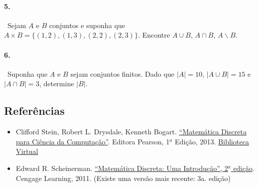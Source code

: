 \paragraph{5.}~Sejam \(A\) e \(B\) conjuntos e suponha que
  \(A\times B=\{(1,2),(1,3),(2,2),(2,3)\}\). Encontre \(A\cup B\),
  \(A\cap B\), \(A\backslash B\).


\paragraph{6.}~Suponha que \(A\) e \(B\) sejam conjuntos finitos. Dado que
  \(|A|=10\), \(|A\cup B|=15\) e \(|A\cap B|=3\), determine \(|B|\).

\subsection*{Referências}

\begin{itemize}
\item
  Clifford Stein, Robert L. Drysdale, Kenneth Bogart.
  \href{https://plataforma.bvirtual.com.br/Acervo/Publicacao/3824}{``Matemática
  Discreta para Ciência da Computação''}. Editora Pearson, 1$^a$ Edição,
  2013.
  \href{https://plataforma.bvirtual.com.br/Acervo/Publicacao/3824}{Biblioteca
  Virtual}
\item
  Edward R. Scheinerman.
  \href{https://www.amazon.com.br/Matem\%C3\%A1tica-Discreta-Introdu\%C3\%A7\%C3\%A3o-Edward-Scheinerman/dp/8522107963/}{``Matemática
  Discreta: Uma Introdução'', 2$^a$ edição}. Cengage Learning, 2011.
  (Existe uma versão mais recente: 3a. edição)
\end{itemize}

